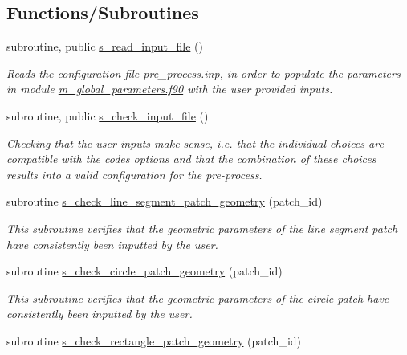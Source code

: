 \subsection*{Functions/\+Subroutines}
\begin{DoxyCompactItemize}
\item 
subroutine, public \hyperlink{namespacem__start__up_ae0571e78c0179c22d3811df31c33c321}{s\+\_\+read\+\_\+input\+\_\+file} ()
\begin{DoxyCompactList}\small\item\em Reads the configuration file pre\+\_\+process.\+inp, in order to populate the parameters in module \hyperlink{m__global__parameters_8f90}{m\+\_\+global\+\_\+parameters.\+f90} with the user provided inputs. \end{DoxyCompactList}\item 
subroutine, public \hyperlink{namespacem__start__up_ab5f7e03f1da1999ee699cec4f26370e0}{s\+\_\+check\+\_\+input\+\_\+file} ()
\begin{DoxyCompactList}\small\item\em Checking that the user inputs make sense, i.\+e. that the individual choices are compatible with the code\textquotesingle{}s options and that the combination of these choices results into a valid configuration for the pre-\/process. \end{DoxyCompactList}\item 
subroutine \hyperlink{namespacem__start__up_a9a3e975da11ddbbabdf66a66ff9167d1}{s\+\_\+check\+\_\+line\+\_\+segment\+\_\+patch\+\_\+geometry} (patch\+\_\+id)
\begin{DoxyCompactList}\small\item\em This subroutine verifies that the geometric parameters of the line segment patch have consistently been inputted by the user. \end{DoxyCompactList}\item 
subroutine \hyperlink{namespacem__start__up_a2ab9d448e20b9f9b5db3adbb28e011fe}{s\+\_\+check\+\_\+circle\+\_\+patch\+\_\+geometry} (patch\+\_\+id)
\begin{DoxyCompactList}\small\item\em This subroutine verifies that the geometric parameters of the circle patch have consistently been inputted by the user. \end{DoxyCompactList}\item 
subroutine \hyperlink{namespacem__start__up_a038565f6f0f4ed12a0a3738ab880f507}{s\+\_\+check\+\_\+rectangle\+\_\+patch\+\_\+geometry} (patch\+\_\+id)

\end{DoxyCompactItemize}
